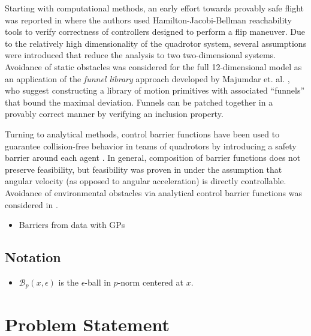 \documentclass[conference]{IEEEtran}
\begin{document}
Starting with computational methods, an early effort towards provably safe flight was reported in \cite{Gillula2010} where the authors used Hamilton-Jacobi-Bellman reachability tools to verify correctness of controllers designed to perform a flip maneuver. Due to the relatively high dimensionality of the quadrotor system, several assumptions were introduced that reduce the analysis to two two-dimensional systems. Avoidance of static obstacles was considered for the full 12-dimensional model as an application of the \emph{funnel library} approach developed by Majumdar et. al. \cite{Majumdar2017}, who suggest constructing a library of motion primitives with associated ``funnels'' that bound the maximal deviation. Funnels can be patched together in a provably correct manner by verifying an inclusion property.

Turning to analytical methods, control barrier functions have been used to guarantee collision-free behavior in teams of quadrotors by introducing a safety barrier around each agent \cite{Wang2017a}. In general, composition of barrier functions does not preserve feasibility, but feasibility was proven in \cite{Wang2017} under the assumption that angular velocity (as opposed to angular acceleration) is directly controllable. Avoidance of environmental obstacles via analytical control barrier functions was considered in \cite{Wu2016}.

\begin{itemize}
  \item Barriers from data with GPs \cite{Wang2017c}
\end{itemize}

\subsection{Notation}

\begin{itemize}
  \item $\mathcal B_p(x,\epsilon)$ is the $\epsilon$-ball in $p$-norm centered at $x$.
\end{itemize}

\section{Problem Statement}
\end{document}
